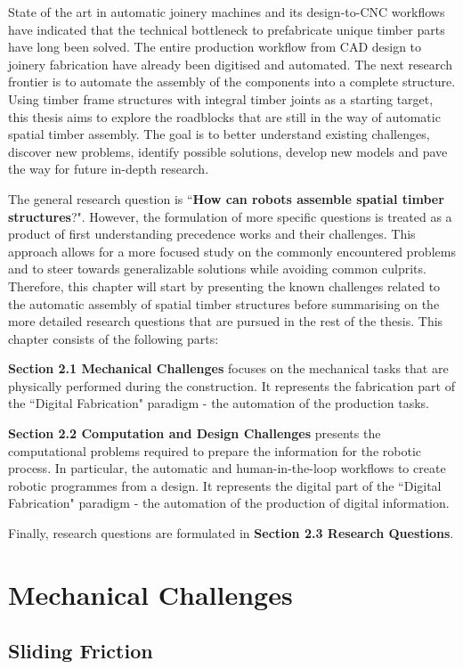 \documentclass[11pt]{book}
\begin{document}
State of the art in automatic joinery machines and its design-to-CNC workflows have indicated that the technical bottleneck to prefabricate unique timber parts have long been solved. The entire production workflow from CAD design to joinery fabrication have already been digitised and automated. The next research frontier is to automate the assembly of the components into a complete structure. Using timber frame structures with integral timber joints as a starting target, this thesis aims to explore the roadblocks that are still in the way of automatic spatial timber assembly. The goal is to better understand existing challenges, discover new problems, identify possible solutions, develop new models and pave the way for future in-depth research.

The general research question is ``\textbf{How can robots assemble spatial timber structures}?". However, the formulation of more specific questions is treated as a product of first understanding precedence works and their challenges. This approach allows for a more focused study on the commonly encountered problems and to steer towards generalizable solutions while avoiding common culprits. Therefore, this chapter will start by presenting the known challenges related to the automatic assembly of spatial timber structures before summarising on the more detailed research questions that are pursued in the rest of the thesis. This chapter consists of the following parts: 

\textbf{Section 2.1 Mechanical Challenges }focuses on the mechanical tasks that are physically performed during the construction. It represents the fabrication part of the ``Digital Fabrication" paradigm - the automation of the production tasks.

\textbf{Section 2.2 Computation and Design Challenges} presents the computational problems required to prepare the information for the robotic process. In particular, the automatic and human-in-the-loop workflows to create robotic programmes from a design. It represents the digital part of the ``Digital Fabrication" paradigm - the automation of the production of digital information.

Finally, research questions are formulated in \textbf{Section 2.3 Research Questions}. 

\section{Mechanical Challenges}

\subsection{Sliding Friction}
\end{document}
